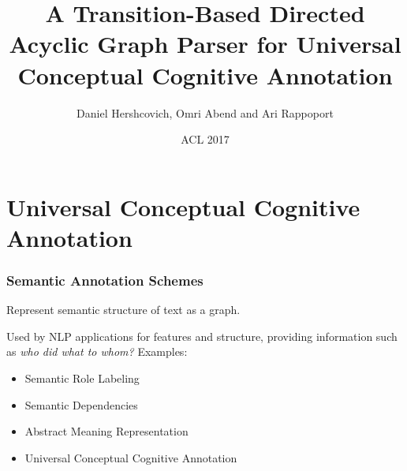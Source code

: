 \documentclass[t]{beamer}
\begin{document}
\title[A Transition-Based DAG Parser for UCCA]{A Transition-Based Directed Acyclic Graph Parser for Universal Conceptual Cognitive Annotation}
\author[Daniel Hershcovich]{Daniel Hershcovich, Omri Abend and Ari Rappoport}
\date{ACL 2017}

\begin{frame}
\titlepage
\end{frame}



\section{Universal Conceptual Cognitive Annotation}

\begin{frame}
\frametitle{Semantic Annotation Schemes}
Represent semantic structure of text as a graph.

Used by NLP applications for features and structure,
providing information such as \textit{who did what to whom?}
\vfill
Examples:
\begin{itemize}
 \item Semantic Role Labeling
 \item Semantic Dependencies
 \item Abstract Meaning Representation
 \item Universal Conceptual Cognitive Annotation
\end{itemize}
\end{frame}
\end{document}
